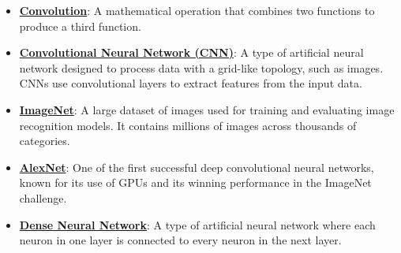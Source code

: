 \documentclass{article}%
\begin{document}
\begin{itemize}[leftmargin=*]
\item \href{https://purdue.brightspace.com/d2l/common/assets/pdfjs-d2l-dist/1.0.14-legacy/web/viewer.html?file=\%2Fcontent\%2Fenforced\%2F1095467-wl.202510.CS.24300.001\%2F08L2-Feature Extraction.pdf\%3Fou\%3D1095467\&lang=en-us\&container=d2l-fileviewer-rendered-pdf\&fullscreen=d2l-fileviewer-rendered-pdf-dialog\&height=667#page=33}{\textbf{Convolution}}: A mathematical operation that combines two functions to produce a third function.%
\end{itemize}%
\begin{itemize}[leftmargin=*]%
\item \href{https://purdue.brightspace.com/d2l/common/assets/pdfjs-d2l-dist/1.0.14-legacy/web/viewer.html?file=\%2Fcontent\%2Fenforced\%2F1095467-wl.202510.CS.24300.001\%2F09L1-cnn.pdf\%3Fou\%3D1095467\&lang=en-us\&container=d2l-fileviewer-rendered-pdf\&fullscreen=d2l-fileviewer-rendered-pdf-dialog\&height=667#page=2}{\textbf{Convolutional Neural Network (CNN)}}: A type of artificial neural network designed to process data with a grid-like topology, such as images. CNNs use convolutional layers to extract features from the input data.%
\item \href{https://purdue.brightspace.com/d2l/common/assets/pdfjs-d2l-dist/1.0.14-legacy/web/viewer.html?file=\%2Fcontent\%2Fenforced\%2F1095467-wl.202510.CS.24300.001\%2F09L1-cnn.pdf\%3Fou\%3D1095467\&lang=en-us\&container=d2l-fileviewer-rendered-pdf\&fullscreen=d2l-fileviewer-rendered-pdf-dialog\&height=667#page=3}{\textbf{ImageNet}}: A large dataset of images used for training and evaluating image recognition models. It contains millions of images across thousands of categories.%
\item \href{https://purdue.brightspace.com/d2l/common/assets/pdfjs-d2l-dist/1.0.14-legacy/web/viewer.html?file=\%2Fcontent\%2Fenforced\%2F1095467-wl.202510.CS.24300.001\%2F09L1-cnn.pdf\%3Fou\%3D1095467\&lang=en-us\&container=d2l-fileviewer-rendered-pdf\&fullscreen=d2l-fileviewer-rendered-pdf-dialog\&height=667#page=3}{\textbf{AlexNet}}: One of the first successful deep convolutional neural networks, known for its use of GPUs and its winning performance in the ImageNet challenge.%
\item \href{https://purdue.brightspace.com/d2l/common/assets/pdfjs-d2l-dist/1.0.14-legacy/web/viewer.html?file=\%2Fcontent\%2Fenforced\%2F1095467-wl.202510.CS.24300.001\%2F09L1-cnn.pdf\%3Fou\%3D1095467\&lang=en-us\&container=d2l-fileviewer-rendered-pdf\&fullscreen=d2l-fileviewer-rendered-pdf-dialog\&height=667#page=4}{\textbf{Dense Neural Network}}: A type of artificial neural network where each neuron in one layer is connected to every neuron in the next layer.%

\end{itemize}
\end{document}
